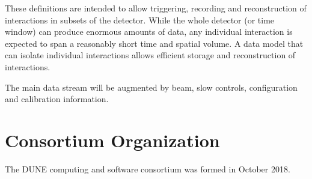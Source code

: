 These definitions are intended to allow triggering, recording and reconstruction of interactions in subsets of the detector. While the whole detector (or time window) can produce enormous amounts of data, any individual interaction is expected to span a reasonably short time and spatial volume. A data model that can isolate individual interactions  allows efficient storage and reconstruction of interactions. 


The main data stream will be augmented by beam, slow controls,  configuration and calibration information. 


\section{Consortium Organization}

The DUNE computing and software consortium was formed in October 2018.  












